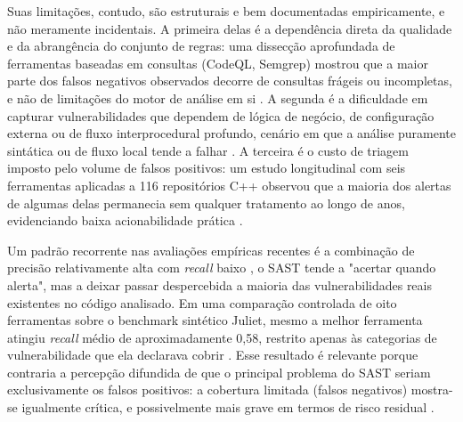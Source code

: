 Suas limitações, contudo, são estruturais e bem documentadas empiricamente, e não meramente incidentais. A primeira delas é a dependência direta da qualidade e da abrangência do conjunto de regras: uma dissecção aprofundada de ferramentas baseadas em consultas (CodeQL, Semgrep) mostrou que a maior parte dos falsos negativos observados decorre de consultas frágeis ou incompletas, e não de limitações do motor de análise em si \cite{Li2024SASTCC}. A segunda é a dificuldade em capturar vulnerabilidades que dependem de lógica de negócio, de configuração externa ou de fluxo interprocedural profundo, cenário em que a análise puramente sintática ou de fluxo local tende a falhar \cite{Zhu2024SASTAndroid}. A terceira é o custo de triagem imposto pelo volume de falsos positivos: um estudo longitudinal com seis ferramentas aplicadas a 116 repositórios C++ observou que a maioria dos alertas de algumas delas permanecia sem qualquer tratamento ao longo de anos, evidenciando baixa acionabilidade prática \cite{Aloraini2019SASTWarnings}.

Um padrão recorrente nas avaliações empíricas recentes é a combinação de precisão relativamente alta com \textit{recall} baixo , o SAST tende a "acertar quando alerta", mas a deixar passar despercebida a maioria das vulnerabilidades reais existentes no código analisado. Em uma comparação controlada de oito ferramentas sobre o benchmark sintético Juliet, mesmo a melhor ferramenta atingiu \textit{recall} médio de aproximadamente 0,58, restrito apenas às categorias de vulnerabilidade que ela declarava cobrir \cite{Esposito2024SASTComparison}. Esse resultado é relevante porque contraria a percepção difundida de que o principal problema do SAST seriam exclusivamente os falsos positivos: a cobertura limitada (falsos negativos) mostra-se igualmente crítica, e possivelmente mais grave em termos de risco residual \cite{Esposito2024SASTComparison, Li2023SASTJava}.

